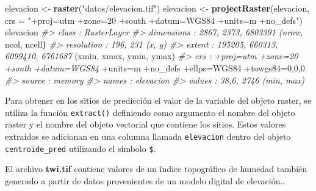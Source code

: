 \documentclass[11pt,b5paper,]{krantz}
\newenvironment{Shaded}{}{}
\newcommand{\KeywordTok}[1]{\textcolor[rgb]{0.00,0.44,0.13}{\textbf{#1}}}
\newcommand{\DataTypeTok}[1]{\textcolor[rgb]{0.56,0.13,0.00}{#1}}
\newcommand{\DecValTok}[1]{\textcolor[rgb]{0.25,0.63,0.44}{#1}}
\newcommand{\StringTok}[1]{\textcolor[rgb]{0.25,0.44,0.63}{#1}}
\newcommand{\CommentTok}[1]{\textcolor[rgb]{0.38,0.63,0.69}{\textit{#1}}}
\newcommand{\OperatorTok}[1]{\textcolor[rgb]{0.40,0.40,0.40}{#1}}
\newcommand{\ErrorTok}[1]{\textcolor[rgb]{1.00,0.00,0.00}{\textbf{#1}}}
\newcommand{\NormalTok}[1]{#1}
\begin{document}
\begin{Shaded}
\begin{Highlighting}[]
\NormalTok{elevacion <-}\StringTok{ }\KeywordTok{raster}\NormalTok{(}\StringTok{"datos/elevacion.tif"}\NormalTok{)}
\NormalTok{elevacion <-}
\StringTok{  }\KeywordTok{projectRaster}\NormalTok{(elevacion, }
                \DataTypeTok{crs =} \StringTok{"+proj=utm +zone=20 +south }
\StringTok{                +datum=WGS84 +units=m +no_defs"}\NormalTok{)}
\NormalTok{elevacion}
\CommentTok{#> class : RasterLayer}
\CommentTok{#> dimensions : 2867, 2373, 6803391 (nrow,}
\NormalTok{ncol, ncell}\ErrorTok{)}
\CommentTok{#> resolution : 196, 231 (x, y)}
\CommentTok{#> extent : 195205, 660313, 6099410, 6761687}
\NormalTok{(xmin, xmax, ymin, ymax)}
\CommentTok{#> crs : +proj=utm +zone=20 +south +datum=WGS84}
\OperatorTok{+}\NormalTok{units=m }\OperatorTok{+}\NormalTok{no_defs }\OperatorTok{+}\NormalTok{ellps=WGS84 }\OperatorTok{+}\NormalTok{towgs84=}\DecValTok{0}\NormalTok{,}\DecValTok{0}\NormalTok{,}\DecValTok{0}
\CommentTok{#> source : memory}
\CommentTok{#> names : elevacion}
\CommentTok{#> values : 38,6, 2746 (min, max)}
\end{Highlighting}
\end{Shaded}

Para obtener en los sitios de predicción el valor de la variable del
objeto raster, se utiliza la función \texttt{extract()} definiendo como
argumento el nombre del objeto raster y el nombre del objeto vectorial
que contiene los sitios. Estos valores extraídos se adicionan en una
columna llamada \texttt{elevacion} dentro del objeto
\texttt{centroide\_pred} utilizando el símbolo \texttt{\$}.

\begin{Shaded}
\end{Shaded}

El archivo \textbf{twi.tif} contiene valores de un índice topográfico de
humedad también generado a partir de datos provenientes de un modelo
digital de elevación..
\end{document}
